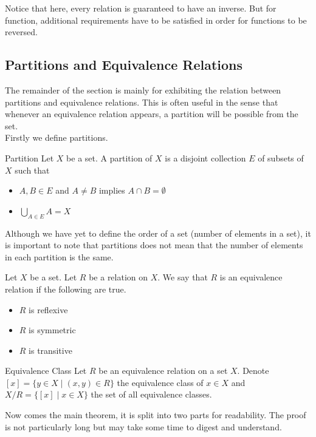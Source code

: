 \documentclass[a4paper]{article}
\begin{document}
Notice that here, every relation is guaranteed to have an inverse. But for function, additional requirements have to be satisfied in order for functions to be reversed. \\

\subsection{Partitions and Equivalence Relations}
The remainder of the section is mainly for exhibiting the relation between partitions and equivalence relations. This is often useful in the sense that whenever an equivalence relation appears, a partition will be possible from the set. \\
Firstly we define partitions. 

\begin{defn}{Partition}{} Let $X$ be a set. A partition of $X$ is a disjoint collection $E$ of subsets of $X$ such that
\begin{itemize}
\item $A,B\in E$ and $A\neq B$ implies $A\cap B=\emptyset$
\item $\bigcup_{A\in E}A=X$
\end{itemize}
\end{defn}

Although we have yet to define the order of a set (number of elements in a set), it is important to note that partitions does not mean that the number of elements in each partition is the same. 

\begin{defn}{}{} Let $X$ be a set. Let $R$ be a relation on $X$. We say that $R$ is an equivalence relation if the following are true. 
\begin{itemize}
\item $R$ is reflexive
\item $R$ is symmetric
\item $R$ is transitive
\end{itemize}
\end{defn}

\begin{defn}{Equivalence Class}{} Let $R$ be an equivalence relation on a set $X$. Denote $[x]=\{y\in X\;|\;(x,y)\in R\}$ the equivalence class of $x\in X$ and $X/R=\{[x]\;|\;x\in X\}$ the set of all equivalence classes. 
\end{defn}

Now comes the main theorem, it is split into two parts for readability. The proof is not particularly long but may take some time to digest and understand. 
\end{document}
